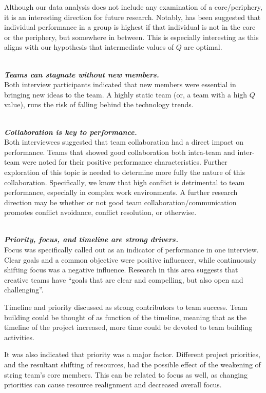 \documentclass{proc}
\begin{document}
Although our data analysis does not include any examination of a core/periphery, it is an interesting direction for future research. Notably, has been suggested that individual performance in a group is highest if that individual is not in the core or the periphery, but somewhere in between\cite{cattani2008core}. This is especially interesting as this aligns with our hypothesis that intermediate values of $Q$ are optimal.

\noindent\\\textit{\textbf{Teams can stagnate without new members.}}\\
Both interview participants indicated that new members were essential in bringing new ideas to the team. A highly static team (or, a team with a high $Q$ value), runs the risk of falling behind the technology trends.

\noindent\\\textit{\textbf{Collaboration is key to performance.}}\\
Both interviewees suggested that team collaboration had a direct impact on performance. Teams that showed good collaboration both intra-team and inter-team were noted for their positive performance characteristics. Further exploration of this topic is needed to determine more fully the nature of this collaboration. Specifically, we know that high conflict is detrimental to team performance, especially in complex work environments\cite{de2003task}. A further research direction may be whether or not good team collaboration/communication promotes conflict avoidance, conflict resolution, or otherwise.

\noindent\\\textit{\textbf{Priority, focus, and timeline are strong drivers.}}\\
Focus was specifically called out as an indicator of performance in one interview. Clear goals and a common objective were positive influencer, while continuously shifting focus was a negative influence. Research in this area suggests that creative teams have ``goals that are clear and compelling, but also open and challenging''\cite{isaksen2002climate}.

Timeline and priority discussed as strong contributors to team success. Team building could be thought of as function of the timeline, meaning that as the timeline of the project increased, more time could be devoted to team building activities.

It was also indicated that priority was a major factor. Different project priorities, and the resultant shifting of resources, had the possible effect of the weakening of string team's core members. This can be related to focus as well, as changing priorities can cause resource realignment and decreased overall focus.
\end{document}
